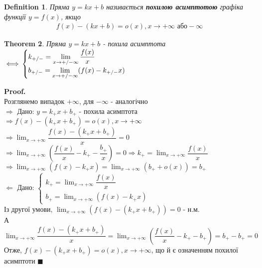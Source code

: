 \documentclass[a4paper, 14pt]{extarticle}
\def\huge{\displaystyle}
\def\bigline{\vspace{5mm}\\}
\def\rightproof{$\boxed{\Rightarrow}$ }
\def\leftproof{$\boxed{\Leftarrow}$ }
\theoremstyle{theoremdd}
\newtheorem{theorem}{Theorem}[subsection]
\theoremstyle{theoremdd}
\newtheorem{definition}[theorem]{Definition}
\theoremstyle{theoremdd}
\theoremstyle{theoremdd}
\theoremstyle{theoremdd}
\theoremstyle{theoremdd}
\theoremstyle{theoremdd}
\theoremstyle{theoremdd}
\newenvironment{pf}{\vspace*{-3mm} \textbf{Proof. \\}}{$\blacksquare$}
\begin{document}
\begin{definition}
Пряма $y = kx + b$ називається \textbf{похилою асимптотою} графіка функції $y = f(x)$, якщо
\begin{align*}
f(x) - (kx+b) = o(x), x \to +\infty \textrm{ або} -\infty
\end{align*}
\end{definition}

\begin{theorem}
Пряма $y = kx+b$ - похила асимптота $\iff \\ \begin{cases} k_{+/-} = \huge \lim_{x \to +/- \infty} \dfrac{f(x)}{x} \\ b_{+/-} = \huge \lim_{x \to +/- \infty} (f(x)-k_{+/-}x) \end{cases}$
\end{theorem}
\begin{pf}
Розглянемо випадок $+\infty$, для $-\infty$ - аналогічно\\
\rightproof Дано:
$y = k_+ x+b_+$ - похила асимптота $\Rightarrow f(x) - (k_+x+b_+) = o(x), x \to +\infty$\\
$\Rightarrow \huge \lim_{x \to +\infty} \dfrac{f(x)-(k_+ x + b_+)}{x} = 0$\\
$\Rightarrow \huge \lim_{x \to +\infty} \left( \dfrac{f(x)}{x} - k_+ - \dfrac{b_+}{x} \right) = 0 \Rightarrow k_+ = \huge \lim_{x \to +\infty} \dfrac{f(x)}{x}$\\
$\Rightarrow \huge \lim_{x \to +\infty} (f(x) - k_+ x) = \lim_{x \to +\infty} (b_+ + o(x)) = b_+$
\bigline
\leftproof Дано: $\begin{cases} k_{+} = \huge \lim_{x \to + \infty} \dfrac{f(x)}{x} \\ b_{+} = \huge \lim_{x \to + \infty} (f(x)-k_{+}x) \end{cases}$\\
Із другої умови, $\huge \lim_{x \to +\infty} (f(x)-(k_+ x + b_+)) = 0$ - н.м.\\
А $\huge \lim_{x \to +\infty} \dfrac{f(x)-(k_+ x +b_+)}{x} = \lim_{x \to +\infty} \left( \dfrac{f(x)}{x} - k_+ - b_+ \right) = b_+ - b_+ = 0$\\
Отже, $f(x)-(k_+ x + b_+) = o(x), x \to +\infty$, що й є означенням похилої асимптоти
\end{pf}
\end{document}
